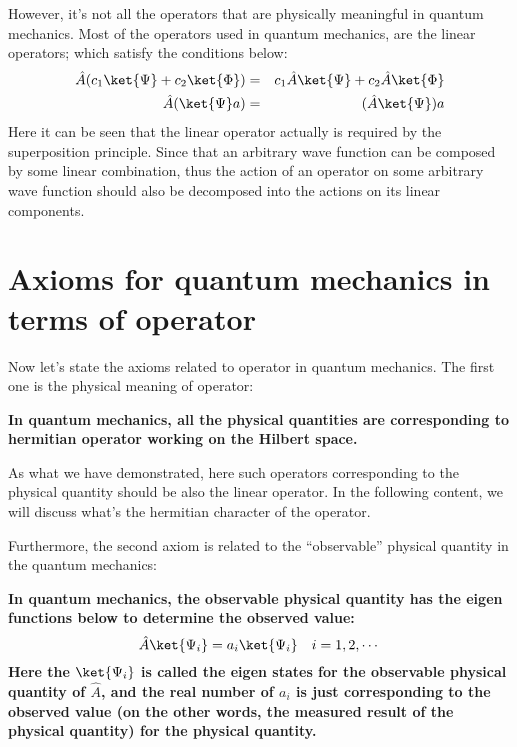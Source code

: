 However, it's not all the operators that are physically meaningful
in quantum mechanics. Most of the operators used in quantum
mechanics, are the linear operators; which satisfy the conditions
below:
\begin{eqnarray}
  \hat{A}(c_{1}\ket{\Psi} + c_{2}\ket{\Phi}) &=&
  c_{1}\hat{A}\ket{\Psi} + c_{2}\hat{A}\ket{\Phi} \nonumber \\
  \hat{A}(\ket{\Psi}a) &=& (\hat{A}\ket{\Psi})a
\end{eqnarray}
Here it can be seen that the linear operator actually is required by
the superposition principle. Since that an arbitrary wave function
can be composed by some linear combination, thus the action of an
operator on some arbitrary wave function should also be decomposed
into the actions on its linear components.

\section{Axioms for quantum mechanics in terms of operator}
\label{AFQMITOO_in_operator}
%
%
Now let's state the axioms related to operator in quantum
mechanics. The first one is the physical meaning of operator:
\begin{axiom}\label{axiom2}
\textbf{In quantum mechanics, all the physical quantities are
  corresponding to hermitian operator working on the Hilbert space.}
\end{axiom}
As what we have demonstrated, here such operators corresponding to the
physical quantity should be also the linear operator. In the following
content, we will discuss what's the hermitian character of the
operator.

Furthermore, the second axiom is related to the ``observable''
physical quantity in the quantum mechanics:
\begin{axiom}\label{axiom3}
  \textbf{ In quantum mechanics, the observable physical quantity
has the eigen functions below to determine the observed value:
\begin{equation}\label{OPERATOReq:8}
  \hat{A}\ket{\Psi_{i}} = a_{i}\ket{\Psi_{i}} \quad i=1, 2, \cdots
\end{equation}
Here the $\ket{\Psi_{i}}$ is called the eigen states for the
observable physical quantity of $\hat{A}$, and the real number of
$a_{i}$ is just corresponding to the observed value (on the other
words, the measured result of the physical quantity) for the physical
quantity.}
\end{axiom}


